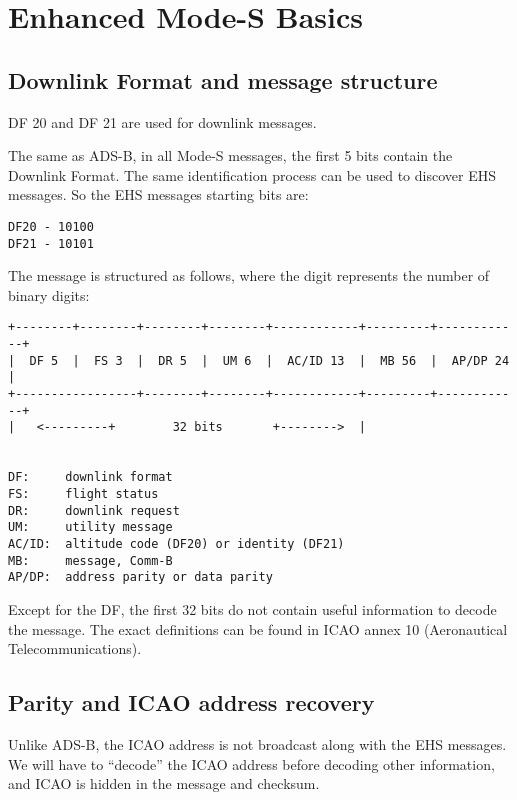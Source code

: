 \section{Enhanced Mode-S Basics}\label{introduction}

\subsection{Downlink Format and message
structure}\label{downlink-format-and-message-structure}

DF 20 and DF 21 are used for downlink messages.

The same as ADS-B, in all Mode-S messages, the first 5 bits contain the
Downlink Format. The same identification process can be used to discover
EHS messages. So the EHS messages starting bits are:

\begin{verbatim}
DF20 - 10100
DF21 - 10101
\end{verbatim}

The message is structured as follows, where the digit represents the
number of binary digits:

\begin{verbatim}
+--------+--------+--------+--------+------------+---------+------------+
|  DF 5  |  FS 3  |  DR 5  |  UM 6  |  AC/ID 13  |  MB 56  |  AP/DP 24  |
+-----------------+--------+--------+------------+---------+------------+
|   <---------+        32 bits       +-------->  |


DF:     downlink format
FS:     flight status
DR:     downlink request
UM:     utility message
AC/ID:  altitude code (DF20) or identity (DF21)
MB:     message, Comm-B
AP/DP:  address parity or data parity
\end{verbatim}

Except for the DF, the first 32 bits do not contain useful information
to decode the message. The exact definitions can be found in ICAO annex
10 (Aeronautical Telecommunications).

\subsection{Parity and ICAO address
recovery}\label{parity-and-icao-address-recovery}

Unlike ADS-B, the ICAO address is not broadcast along with the EHS
messages. We will have to ``decode'' the ICAO address before decoding
other information, and ICAO is hidden in the message and checksum.

